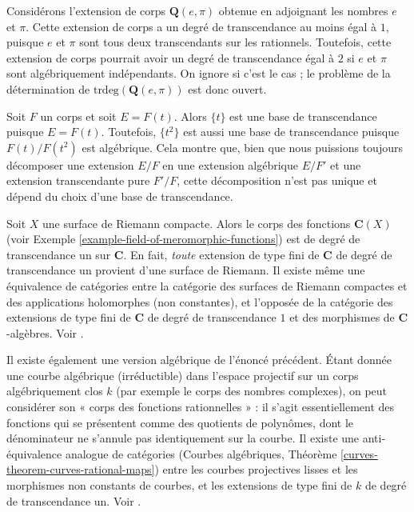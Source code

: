 \begin{example}
\label{example-pi-e-transcendental}
Considérons l'extension de corps $\mathbf{Q}(e, \pi)$ obtenue en
adjoignant les nombres $e$ et $\pi$. Cette extension de corps a un degré de transcendance
au moins égal à $1$, puisque $e$ et $\pi$ sont tous deux transcendants sur les
rationnels. Toutefois, cette extension de corps pourrait avoir un degré de transcendance
égal à $2$ si $e$ et $\pi$ sont algébriquement indépendants. On ignore si
c'est le cas ; le problème de la détermination de
$\text{trdeg}(\mathbf{Q}(e, \pi))$ est donc ouvert.
\end{example}

\begin{example}
\label{example-function-field-not-unique-transcendence-basis}
Soit $F$ un corps et soit $E = F(t)$. Alors $\{t\}$ est une
base de transcendance puisque $E = F(t)$. Toutefois, $\{t^2\}$
est aussi une base de transcendance puisque $F(t)/F(t^2)$ est algébrique.
Cela montre que, bien que nous puissions toujours décomposer une extension
$E/F$ en une extension algébrique $E/F'$ et une
extension transcendante pure $F'/F$, cette décomposition n'est pas unique et
dépend du choix d'une base de transcendance.
\end{example}

\begin{example}
\label{example-riemann-surface-transcendence}
Soit $X$ une surface de Riemann compacte. Alors le corps des fonctions
$\mathbf{C}(X)$ (voir Exemple \ref{example-field-of-meromorphic-functions})
est de degré de transcendance un sur $\mathbf{C}$. En fait, {\it toute}
extension de type fini de $\mathbf{C}$ de degré de transcendance
un provient d'une surface de Riemann. Il existe même une équivalence de
catégories entre la catégorie des surfaces de Riemann compactes et des
applications holomorphes (non constantes), et l'opposée de la catégorie des extensions
de type fini de $\mathbf{C}$ de degré de transcendance $1$
et des morphismes de $\mathbf{C}$-algèbres. Voir \cite{Forster}.

\medskip\noindent
Il existe également une version algébrique de l'énoncé précédent. Étant donnée une
courbe algébrique (irréductible) dans l'espace projectif sur un corps algébriquement
clos $k$ (par exemple le corps des nombres complexes), on peut considérer son
« corps des fonctions rationnelles » : il s'agit essentiellement des fonctions qui se présentent comme
des quotients de polynômes, dont le dénominateur ne s'annule pas identiquement
sur la courbe. Il existe une anti-équivalence analogue de catégories
(Courbes algébriques, Théorème \ref{curves-theorem-curves-rational-maps})
entre les courbes projectives lisses et
les morphismes non constants de courbes, et les extensions de type fini de $k$ de
degré de transcendance un. Voir \cite{H}.
\end{example}

